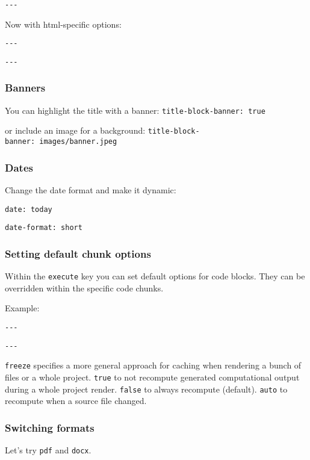 \documentclass[
  letterpaper,
  DIV=11,
  numbers=noendperiod]{scrartcl}
\begin{document}
\texttt{-\/-\/-}

Now with html-specific options:

\texttt{-\/-\/-}

\texttt{-\/-\/-}

\hypertarget{banners}{%
\subsubsection{Banners}\label{banners}}

You can highlight the title with a banner:
\texttt{title-block-banner:\ true}

or include an image for a background:
\texttt{title-block-banner:\ images/banner.jpeg}

\hypertarget{dates}{%
\subsubsection{Dates}\label{dates}}

Change the date format and make it dynamic:

\texttt{date:\ today}

\texttt{date-format:\ short}

\hypertarget{setting-default-chunk-options}{%
\subsubsection{Setting default chunk
options}\label{setting-default-chunk-options}}

Within the \texttt{execute} key you can set default options for code
blocks. They can be overridden within the specific code chunks.

Example:

\texttt{-\/-\/-}

\texttt{-\/-\/-}

\texttt{freeze} specifies a more general approach for caching when
rendering a bunch of files or a whole project. \texttt{true} to not
recompute generated computational output during a whole project render.
\texttt{false} to always recompute (default). \texttt{auto} to recompute
when a source file changed.

\hypertarget{switching-formats}{%
\subsubsection{Switching formats}\label{switching-formats}}

Let's try \texttt{pdf} and \texttt{docx}.
\end{document}
